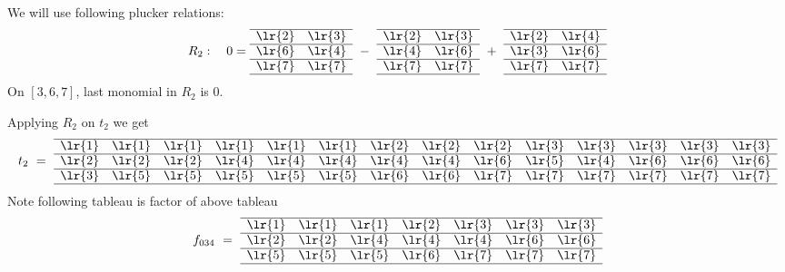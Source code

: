 We will use following plucker relations:
\begin{align*}
R_2 :\ \ \ 0 = 
\begin{array}[c]{*{2}c}\cline{1-2}
\lr{2}&\lr{3}\\\cline{1-2}
\lr{6}&\lr{4}\\\cline{1-2}
\lr{7}&\lr{7}\\\cline{1-2}
\end{array}
\ -\ 
\begin{array}[c]{*{2}c}\cline{1-2}
\lr{2}&\lr{3}\\\cline{1-2}
\lr{4}&\lr{6}\\\cline{1-2}
\lr{7}&\lr{7}\\\cline{1-2}
\end{array}
\ +\ 
\begin{array}[c]{*{2}c}\cline{1-2}
\lr{2}&\lr{4}\\\cline{1-2}
\lr{3}&\lr{6}\\\cline{1-2}
\lr{7}&\lr{7}\\\cline{1-2}
\end{array}
\end{align*}
On \([3,6,7]\), last monomial in \(R_2\) is \(0\).

Applying \(R_2\) on \(t_2\) we get
\begin{align*}
t_2\ =\ 
\begin{array}[c]{*{14}c}\cline{1-14}
\lr{1}&\lr{1}&\lr{1}&\lr{1}&\lr{1}&\lr{1}&\lr{2}&\lr{2}&\lr{2}&\lr{3}&\lr{3}&\lr{3}&\lr{3}&\lr{3}\\\cline{1-14}
\lr{2}&\lr{2}&\lr{2}&\lr{4}&\lr{4}&\lr{4}&\lr{4}&\lr{4}&\lr{6}&\lr{5}&\lr{4}&\lr{6}&\lr{6}&\lr{6}\\\cline{1-14}
\lr{3}&\lr{5}&\lr{5}&\lr{5}&\lr{5}&\lr{5}&\lr{6}&\lr{6}&\lr{7}&\lr{7}&\lr{7}&\lr{7}&\lr{7}&\lr{7}\\\cline{1-14}
\end{array}
\end{align*}
Note following tableau is factor of above tableau
\[
f_{034}\ =\ \begin{array}[c]{*{7}c}\cline{1-7}
\lr{1}&\lr{1}&\lr{1}&\lr{2}&\lr{3}&\lr{3}&\lr{3}\\\cline{1-7}
\lr{2}&\lr{2}&\lr{4}&\lr{4}&\lr{4}&\lr{6}&\lr{6}\\\cline{1-7}
\lr{5}&\lr{5}&\lr{5}&\lr{6}&\lr{7}&\lr{7}&\lr{7}\\\cline{1-7}
\end{array}
\]

